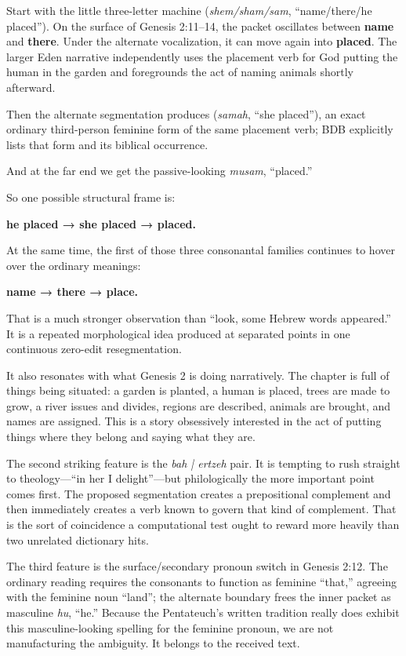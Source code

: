 Start with the little three-letter machine  (\textit{shem/sham/sam}, ``name/there/he placed''). On the surface of Genesis 2:11--14, the packet oscillates between \textbf{name} and \textbf{there}. Under the alternate vocalization, it can move again into \textbf{placed}. The larger Eden narrative independently uses the placement verb for God putting the human in the garden and foregrounds the act of naming animals shortly afterward.\cite{MasoreticGenesis,BDB}

Then the alternate segmentation produces  (\textit{samah}, ``she placed''), an exact ordinary third-person feminine form of the same placement verb; BDB explicitly lists that form and its biblical occurrence.\cite{BDB}

And at the far end we get the passive-looking \textit{musam}, ``placed.''

So one possible structural frame is:

\textbf{he placed → she placed → placed.}

At the same time, the first of those three consonantal families continues to hover over the ordinary meanings:

\textbf{name → there → place.}

That is a much stronger observation than ``look, some Hebrew words appeared.'' It is a repeated morphological idea produced at separated points in one continuous zero-edit resegmentation.

It also resonates with what Genesis 2 is doing narratively. The chapter is full of things being situated: a garden is planted, a human is placed, trees are made to grow, a river issues and divides, regions are described, animals are brought, and names are assigned. This is a story obsessively interested in the act of putting things where they belong and saying what they are.\cite{MasoreticGenesis}

The second striking feature is the \textit{bah | ertzeh} pair. It is tempting to rush straight to theology---``in her I delight''---but philologically the more important point comes first. The proposed segmentation creates a prepositional complement and then immediately creates a verb known to govern that kind of complement. That is the sort of coincidence a computational test ought to reward more heavily than two unrelated dictionary hits.\cite{BDB}

The third feature is the surface/secondary pronoun switch in Genesis 2:12. The ordinary reading requires the consonants to function as feminine ``that,'' agreeing with the feminine noun ``land''; the alternate boundary frees the inner packet as masculine \textit{hu}, ``he.'' Because the Pentateuch's written tradition really does exhibit this masculine-looking spelling for the feminine pronoun, we are not manufacturing the ambiguity. It belongs to the received text.\cite{Hornkohl2024,MasoreticGenesis}

